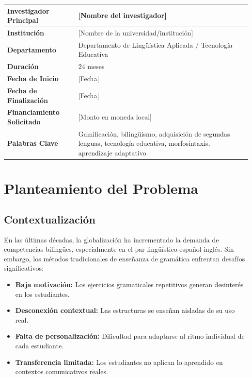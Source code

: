\documentclass[12pt,a4paper]{article}
\begin{document}
\begin{table}[H]
\centering
\begin{tabular}{|l|p{10cm}|}
\hline
\textbf{Investigador Principal} & [Nombre del investigador] \\
\hline
\textbf{Institución} & [Nombre de la universidad/institución] \\
\hline
\textbf{Departamento} & Departamento de Lingüística Aplicada / Tecnología Educativa \\
\hline
\textbf{Duración} & 24 meses \\
\hline
\textbf{Fecha de Inicio} & [Fecha] \\
\hline
\textbf{Fecha de Finalización} & [Fecha] \\
\hline
\textbf{Financiamiento Solicitado} & [Monto en moneda local] \\
\hline
\textbf{Palabras Clave} & Gamificación, bilingüismo, adquisición de segundas lenguas, tecnología educativa, morfosintaxis, aprendizaje adaptativo \\
\hline
\end{tabular}
\end{table}

\section{Planteamiento del Problema}

\subsection{Contextualización}

En las últimas décadas, la globalización ha incrementado la demanda de competencias bilingües, especialmente en el par lingüístico español-inglés. Sin embargo, los métodos tradicionales de enseñanza de gramática enfrentan desafíos significativos:

\begin{itemize}
    \item \textbf{Baja motivación:} Los ejercicios gramaticales repetitivos generan desinterés en los estudiantes.
    \item \textbf{Desconexión contextual:} Las estructuras se enseñan aisladas de su uso real.
    \item \textbf{Falta de personalización:} Dificultad para adaptarse al ritmo individual de cada estudiante.
    \item \textbf{Transferencia limitada:} Los estudiantes no aplican lo aprendido en contextos comunicativos reales.
\end{itemize}
\end{document}
